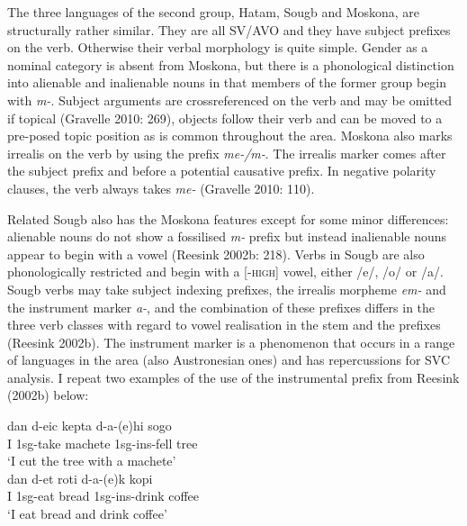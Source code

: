 The three languages of the second group, Hatam, Sougb and Moskona, are structurally rather similar. They are all SV/AVO and they have subject prefixes on the verb. Otherwise their verbal morphology is quite simple. Gender as a nominal category is absent from Moskona, but there is a phonological distinction into alienable and inalienable nouns in that members of the former group begin with \textit{m-}. Subject arguments are crossreferenced on the verb and may be omitted if topical (Gravelle 2010: 269), objects follow their verb and can be moved to a pre-posed topic position as is common throughout the area. Moskona also marks irrealis on the verb by using the prefix \textit{me-/m-}. The irrealis marker comes after the subject prefix and before a potential causative prefix. In negative polarity clauses, the verb always takes \textit{me-} (Gravelle 2010: 110). 

Related Sougb also has the Moskona features except for some minor differences: alienable nouns do not show a fossilised \textit{m-} prefix but instead inalienable nouns appear to begin with a vowel (Reesink 2002b: 218). Verbs in Sougb are also phonologically restricted and begin with a [-\textsc{high}] vowel, either /e/, /o/ or /a/. Sougb verbs may take subject indexing prefixes, the irrealis morpheme \textit{em-} and the instrument marker \textit{a-}, and the combination of these prefixes differs in the three verb classes with regard to vowel realisation in the stem and the prefixes (Reesink 2002b). The instrument marker is a phenomenon that occurs in a range of languages in the area (also Austronesian ones) and has repercussions for SVC analysis. I repeat two examples of the use of the instrumental prefix from Reesink (2002b) below:

\pex 
\a
\gll dan d-eic kepta d-a-(e)hi sogo \\
I \acs{1}\acs{sg}-take machete \acs{1}\acs{sg}-\acs{ins}-fell tree \\
\glft `I cut the tree with a machete' \\ 
\endgl
\a \label{sougb1}
\gla dan d-et roti d-a-(e)k kopi \\ 
I \acs{1}\acs{sg}-eat bread \acs{1}\acs{sg}-\acs{ins}-drink coffee \\
\glft `I eat bread and drink coffee' \\ 
\endgl
\xe

